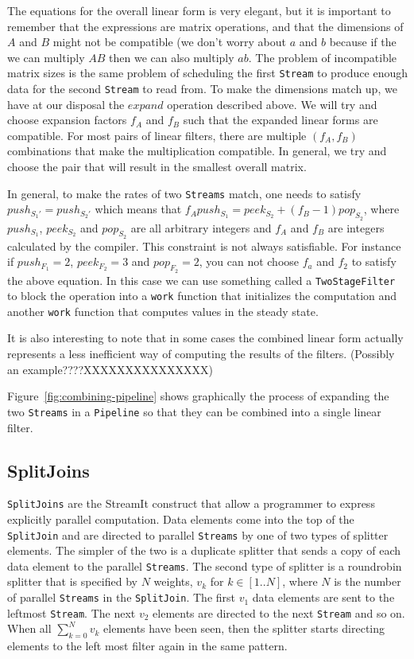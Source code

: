 The equations for the overall linear form is very elegant, but it is important to 
remember that the expressions are matrix operations, and that the dimensions of 
$A$ and $B$ might not be compatible (we don't worry about $a$ and $b$ because if the 
we can multiply $AB$ then we can also multiply $ab$. The problem of incompatible
matrix sizes is the same problem of scheduling the first {\tt Stream} to produce
enough data for the second {\tt Stream} to read from. To make the dimensions match up, 
we have at our disposal the $expand$ operation described above. We will try and 
choose expansion factors $f_A$ and $f_B$ such that the expanded linear forms are
compatible. For most pairs of linear filters, there are multiple $(f_A,f_B)$ combinations
that make the multiplication compatible. In general, we try and choose the pair that
will result in the smallest overall matrix.


In general, to make the rates of two {\tt Streams} match, one needs to satisfy
$push_{S_1'} = push_{S_2'}$ which means that 
$f_Apush_{S_1}=peek_{S_2}+(f_B-1)pop_{S_2}$, where $push_{S_1}$,
$peek_{S_2}$ and $pop_{S_2}$ are all arbitrary integers and 
$f_A$ and $f_B$ are integers calculated by the compiler.
This constraint is not always satisfiable. For instance if
$push_{F_1}=2$, $peek_{F_2}=3$ and $pop_{F_2}=2$, you can not
choose $f_a$ and $f_2$ to satisfy the above equation. In this 
case we can use something called a {\tt TwoStageFilter} to block
the operation into a {\tt work} function that initializes the 
computation and another {\tt work} function that computes values
in the steady state.

It is also interesting to note that in some cases the combined linear form
actually represents a less inefficient way of computing the results of the
filters. (Possibly an example????XXXXXXXXXXXXXXX)

Figure~\ref{fig:combining-pipeline} shows graphically the process of expanding the
two {\tt Streams} in a {\tt Pipeline} so that they can be combined into a single linear filter.



\subsection{SplitJoins}
{\tt SplitJoins} are the StreamIt construct that allow a programmer to express explicitly 
parallel computation. Data elements come into the top of the {\tt SplitJoin} and are directed
to parallel {\tt Streams} by one of two types of splitter elements. 
The simpler of the two is a duplicate splitter that sends a copy of 
each data element to the parallel {\tt Streams}. The second type of splitter is a roundrobin splitter 
that is specified by $N$ weights, $v_k$ for $k\in[1..N]$, 
where $N$ is the number of parallel {\tt Streams} in the {\tt SplitJoin}. The first $v_1$ data elements
are sent to the leftmost {\tt Stream}. The next $v_2$ elements
are directed to the next {\tt Stream} and so on. When all $\sum_{k=0}^{N} v_k$ elements
have been seen, then the splitter starts directing elements to the left most filter again in the
same pattern.

